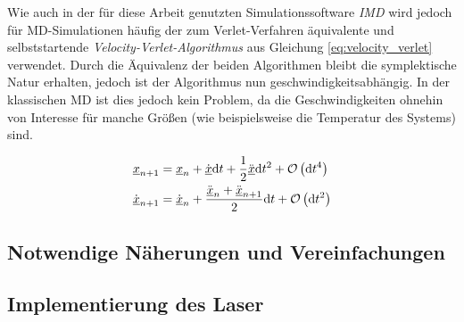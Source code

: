 		Wie auch in der für diese Arbeit genutzten Simulationssoftware \emph{IMD}
		\cite{stadler1997imd} wird jedoch für MD-Simulationen häufig der zum Verlet-Verfahren
		äquivalente und selbststartende \emph{Velocity-Verlet-Algorithmus} aus Gleichung
		\eqref{eq:velocity_verlet} verwendet. Durch die Äquivalenz der beiden Algorithmen bleibt
		die symplektische Natur erhalten, jedoch ist der Algorithmus nun geschwindigkeitsabhängig.
		In der klassischen MD ist dies jedoch kein Problem, da die Geschwindigkeiten ohnehin von
		Interesse für manche Größen (wie beispielsweise die Temperatur des Systems) sind.

		\begin{align}
			\underline{x}_{n+1} &= \underline{x}_n + \dot{\underline{x}}\text{d} t
				+ \frac{1}{2}\ddot{\underline{x}}\text{d} t^2 + \operatorname{\mathcal{O}}\left(\text{d} t^4\right) \nonumber\\
			\dot{\underline{x}}_{n+1} &= \dot{\underline{x}}_n + \frac{\ddot{\underline{x}}_n +
				\ddot{\underline{x}}_{n+1}}{2}\text{d} t + \operatorname{\mathcal{O}}\left(\text{d} t^2\right)
				\label{eq:velocity_verlet}
		\end{align}

	\subsection{Notwendige Näherungen und Vereinfachungen}
	\subsection{Implementierung des Laser}
